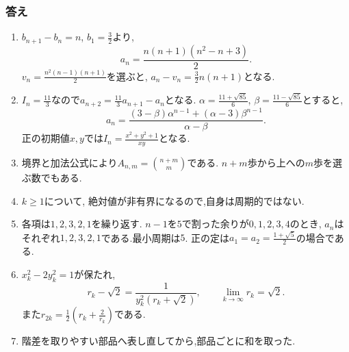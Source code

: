 \subsubsection{答え}
\begin{enumerate}[label=\textbf{問\arabic*.},format=\bookitemlink{practice-connections}{answer}{problem}]
  \item $b_{n+1}-b_n=n$, $b_1=\frac32$より,
    \[
      a_n=\frac{n(n+1)(n^2-n+3)}2.
    \]
    $v_n=\frac{n^2(n-1)(n+1)}2$を選ぶと,
    $a_n-v_n=\frac32n(n+1)$となる.
  \item $I_n=\frac{11}{3}$なので$a_{n+2}=\frac{11}{3}a_{n+1}-a_n$となる.
    $\alpha=\frac{11+\sqrt{85}}{6}$, $\beta=\frac{11-\sqrt{85}}{6}$とすると,
    \[
      a_n=\frac{(3-\beta)\alpha^{n-1}+(\alpha-3)\beta^{n-1}}{\alpha-\beta}.
    \]
    正の初期値$x,y$では$I_n=\frac{x^2+y^2+1}{xy}$となる.
  \item 境界と加法公式により$A_{n,m}=\binom{n+m}{m}$である.
    $n+m$歩から上への$m$歩を選ぶ数でもある.
  \item $k\ge1$について,
    \BookMathLayout{\[
        a_{2k-1}=\frac{1+5(-2)^{k-1}}3,\qquad
        a_{2k}=-\frac{1+5(-2)^{k-1}}3.
      \]}{\[
        \begin{aligned}
          a_{2k-1}&=\frac{1+5(-2)^{k-1}}3,\\
          a_{2k}&=-\frac{1+5(-2)^{k-1}}3.
        \end{aligned}
      \]}
    絶対値が非有界になるので,自身は周期的ではない.
  \item 各項は$1,2,3,2,1$を繰り返す.
    $n-1$を$5$で割った余りが$0,1,2,3,4$のとき,
    $a_n$はそれぞれ$1,2,3,2,1$である.最小周期は$5$.
    正の定は$a_1=a_2=\frac{1+\sqrt5}{2}$の場合である.
  \item $x_k^2-2y_k^2=1$が保たれ,
    \[
      r_k-\sqrt2=\frac1{y_k^2(r_k+\sqrt2)},\qquad
      \lim_{k\to\infty}r_k=\sqrt2.
    \]
    また$r_{2k}=\frac12\left(r_k+\frac{2}{r_k}\right)$である.
  \item
    \BookMathLayout{\[
        \sum_{j=0}^{N-1}j^3
        =6\binom N4+6\binom N3+\binom N2
        =\frac{N^2(N-1)^2}{4}.
      \]}{\[
        \begin{aligned}
          \sum_{j=0}^{N-1}j^3&=6\binom N4+6\binom N3+\binom N2\\
          &=\frac{N^2(N-1)^2}{4}.
        \end{aligned}
      \]}
    階差を取りやすい部品へ表し直してから,部品ごとに和を取った.
\end{enumerate}

